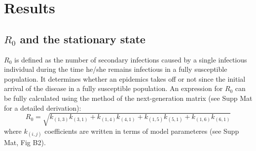 \documentclass[preprint,12pt]{elsarticle}
\begin{document}
\section{Results}

\subsection{$R_0$ and the stationary state}
$R_0$ is defined as the number of secondary infections caused by a single infectious individual during the time he/she remains infectious in a fully susceptible population. It determines whether an epidemics takes off or not since the initial arrival of the disease in a fully susceptible population. An expression for $R_0$ can be fully calculated using the method of the next-generation matrix \cite{Diekmann2010} (see Supp Mat for a detailed derivation):
\begin{equation}
    R_0 = \sqrt{k_{(1,3)}k_{(3,1)} + k_{(1,4)}k_{(4,1)} + k_{(1,5)}k_{(5,1)} + k_{(1,6)}k_{(6,1)}}
    \label{eq:R_0}
\end{equation}
where $k_{(i,j)}$ coefficients are written in terms of model parameteres (see Supp Mat, Fig B2). 
\smallskip
\end{document}
